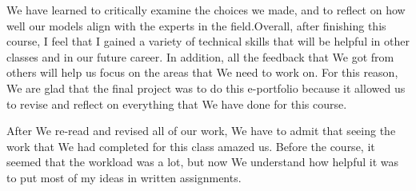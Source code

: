  
We have learned to critically examine the choices we made, and to reflect on how well our models align with the experts in the field.Overall, after finishing this course, I feel that I gained a variety of technical skills that will be helpful in other classes and in our future career. In addition, all the feedback that We got from others will help us focus on the areas that We need to work on. For this reason, We are glad that the final project was to do this e-portfolio because it allowed us to revise and reflect on everything that We have done for this course.
 
After We re-read and revised all of our work, We have to admit that seeing the work that We had completed for this class amazed us. Before the course, it seemed that the workload was a lot, but now We understand how helpful it was to put most of my ideas in written assignments. 